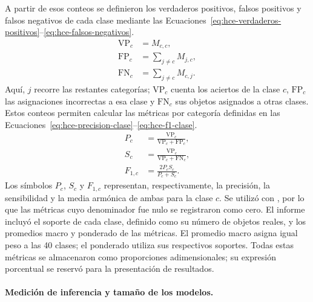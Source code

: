 A partir de esos conteos se definieron los verdaderos positivos, falsos positivos y falsos negativos de cada clase mediante las Ecuaciones~\eqref{eq:hce-verdaderos-positivos}--\eqref{eq:hce-falsos-negativos}.
\begin{subequations}\label{eq:hce-conteos-clase}
\begin{align}
\mathrm{VP}_c &= M_{c,c}, \label{eq:hce-verdaderos-positivos} \\
\mathrm{FP}_c &= \sum_{j\ne c}M_{j,c}, \label{eq:hce-falsos-positivos} \\
\mathrm{FN}_c &= \sum_{j\ne c}M_{c,j}. \label{eq:hce-falsos-negativos}
\end{align}
\end{subequations}
Aquí, $j$ recorre las restantes categorías; $\mathrm{VP}_c$ cuenta los aciertos de la clase $c$, $\mathrm{FP}_c$ las asignaciones incorrectas a esa clase y $\mathrm{FN}_c$ sus objetos asignados a otras clases. Estos conteos permiten calcular las métricas por categoría definidas en las Ecuaciones~\eqref{eq:hce-precision-clase}--\eqref{eq:hce-f1-clase}.
\begin{subequations}\label{eq:hce-metricas-clase}
\begin{align}
P_c &= \frac{\mathrm{VP}_c}{\mathrm{VP}_c+\mathrm{FP}_c}, \label{eq:hce-precision-clase} \\
S_c &= \frac{\mathrm{VP}_c}{\mathrm{VP}_c+\mathrm{FN}_c}, \label{eq:hce-sensibilidad-clase} \\
F_{1,c} &= \frac{2P_cS_c}{P_c+S_c}. \label{eq:hce-f1-clase}
\end{align}
\end{subequations}
Los símbolos $P_c$, $S_c$ y $F_{1,c}$ representan, respectivamente, la precisión, la sensibilidad y la media armónica de ambas para la clase $c$. Se utilizó \protect{} con \protect{}, por lo que las métricas cuyo denominador fue nulo se registraron como cero. El informe incluyó el soporte de cada clase, definido como su número de objetos reales, y los promedios macro y ponderado de las métricas. El promedio macro asigna igual peso a las 40 clases; el ponderado utiliza sus respectivos soportes. Todas estas métricas se almacenaron como proporciones adimensionales; su expresión porcentual se reservó para la presentación de resultados.

\paragraph{Medición de inferencia y tamaño de los modelos.}


